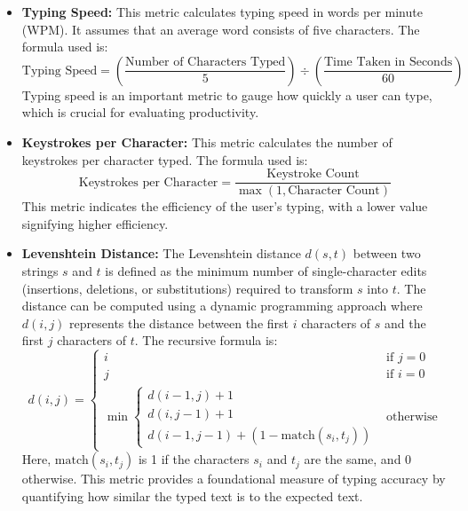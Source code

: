 \begin{itemize}
    \item \textbf{Typing Speed:} This metric calculates typing speed in words per minute (WPM). It assumes that an average word consists of five characters. The formula used is:
    \begin{equation}
    \text{Typing Speed} = \left( \frac{\text{Number of Characters Typed}}{5} \right) \div \left( \frac{\text{Time Taken in Seconds}}{60} \right)
    \end{equation}
    Typing speed is an important metric to gauge how quickly a user can type, which is crucial for evaluating productivity.

    \item \textbf{Keystrokes per Character:} This metric calculates the number of keystrokes per character typed. The formula used is:
    \begin{equation}
    \text{Keystrokes per Character} = \frac{\text{Keystroke Count}}{\max(1, \text{Character Count})}
    \end{equation}
    This metric indicates the efficiency of the user's typing, with a lower value signifying higher efficiency.

    \item \textbf{Levenshtein Distance:} The Levenshtein distance \(d(s, t)\) between two strings \(s\) and \(t\) is defined as the minimum number of single-character edits (insertions, deletions, or substitutions) required to transform \(s\) into \(t\). The distance can be computed using a dynamic programming approach where \(d(i, j)\) represents the distance between the first \(i\) characters of \(s\) and the first \(j\) characters of \(t\). The recursive formula is:
    \begin{equation}
    d(i, j) = \begin{cases} 
      i & \text{if } j = 0 \\
      j & \text{if } i = 0 \\
      \min \begin{cases} 
      d(i-1, j) + 1 \\ 
      d(i, j-1) + 1 \\ 
      d(i-1, j-1) + (1 - \text{match}(s_i, t_j))
      \end{cases} & \text{otherwise}
   \end{cases}
    \end{equation}
    Here, \(\text{match}(s_i, t_j)\) is 1 if the characters \(s_i\) and \(t_j\) are the same, and 0 otherwise. This metric provides a foundational measure of typing accuracy by quantifying how similar the typed text is to the expected text.
\end{itemize}

